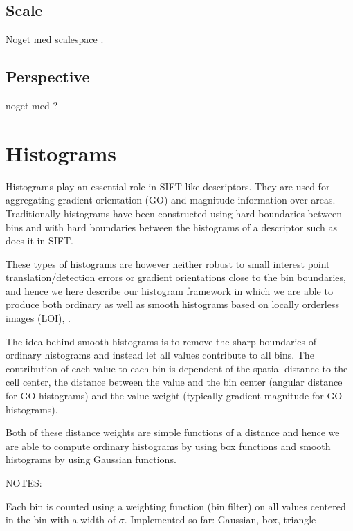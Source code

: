 \documentclass[thesis.tex]{subfiles}
\begin{document}
\subsection{Scale}
\label{sec:scaleInvariance}
Noget med scalespace \cite{griffin1997scale}.

\subsection{Perspective}
noget med ?



\section{Histograms}
\label{sec:histograms}

Histograms play an essential role in SIFT-like descriptors. They are used for aggregating gradient orientation (GO) and magnitude information over areas. Traditionally histograms have been constructed using hard boundaries between bins and with hard boundaries between the histograms of a descriptor such as \citet{lowe2004distinctive} does it in SIFT.

These types of histograms are however neither robust to small interest point translation/detection errors or gradient orientations close to the bin boundaries, and hence we here describe our histogram framework in which we are able to produce both ordinary as well as smooth histograms based on locally orderless images (LOI), \cite{koenderink1999structure}.

The idea behind smooth histograms is to remove the sharp boundaries of ordinary histograms and instead let all values contribute to all bins. The contribution of each value to each bin is dependent of the spatial distance to the cell center, the distance between the value and the bin center (angular distance for GO histograms) and the value weight (typically gradient magnitude for GO histograms).

Both of these distance weights are simple functions of a distance and hence we are able to compute ordinary histograms by using box functions and smooth histograms by using Gaussian functions.

NOTES:

Each bin is counted using a weighting function (bin filter) on all values centered in the bin with a width of $\sigma$.
Implemented so far: Gaussian, box, triangle
\end{document}
